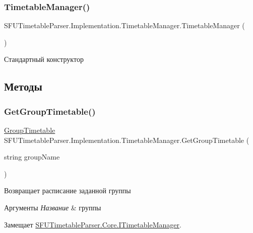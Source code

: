 \subsubsection{\texorpdfstring{Timetable\+Manager()}{TimetableManager()}}
{\footnotesize\ttfamily S\+F\+U\+Timetable\+Parser.\+Implementation.\+Timetable\+Manager.\+Timetable\+Manager (\begin{DoxyParamCaption}{ }\end{DoxyParamCaption})}

Стандартный конструктор 

\subsection{Методы}
\mbox{\label{class_s_f_u_timetable_parser_1_1_implementation_1_1_timetable_manager_a23e17cd28ece08c67288e569380c9602}} 
\subsubsection{\texorpdfstring{Get\+Group\+Timetable()}{GetGroupTimetable()}}
{\footnotesize\ttfamily \hyperlink{class_s_f_u_timetable_parser_1_1_core_1_1_entities_1_1_group_timetable}{Group\+Timetable} S\+F\+U\+Timetable\+Parser.\+Implementation.\+Timetable\+Manager.\+Get\+Group\+Timetable (\begin{DoxyParamCaption}\item[{string}]{group\+Name }\end{DoxyParamCaption})}



Возвращает расписание заданной группы 


\begin{DoxyParams}{Аргументы}
{\em Название} & группы \\
\hline
\end{DoxyParams}


Замещает \hyperlink{interface_s_f_u_timetable_parser_1_1_core_1_1_i_timetable_manager_aeb182ac554490f3c0db80691c1a8f739}{S\+F\+U\+Timetable\+Parser.\+Core.\+I\+Timetable\+Manager}.

